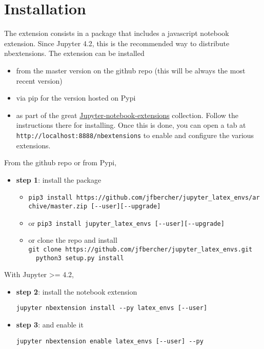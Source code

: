    \section{Installation}\label{installation}

    The extension consists in a package that includes a javascript notebook
extension. Since Jupyter 4.2, this is the recommended way to distribute
nbextensions. The extension can be installed

\begin{itemize}
\tightlist
\item
  from the master version on the github repo (this will be always the
  most recent version)
\item
  via pip for the version hosted on Pypi
\item
  as part of the great
  \href{https://github.com/ipython-contrib/Jupyter-notebook-extensions}{Jupyter-notebook-extensions}
  collection. Follow the instructions there for installing. Once this is
  done, you can open a tab at
  \texttt{http://localhost:8888/nbextensions} to enable and configure
  the various extensions.
\end{itemize}

From the github repo or from Pypi,

\begin{itemize}
\tightlist
\item
  \textbf{step 1}: install the package

  \begin{itemize}
  \tightlist
  \item
    \texttt{pip3\ install\ https://github.com/jfbercher/jupyter\_latex\_envs/archive/master.zip\ {[}-\/-user{]}{[}-\/-upgrade{]}}
  \item
    { or}
    \texttt{pip3\ install\ jupyter\_latex\_envs\ {[}-\/-user{]}{[}-\/-upgrade{]}}
  \item
    { or} clone the repo and install
    \texttt{git\ clone\ https://github.com/jfbercher/jupyter\_latex\_envs.git\ \ \ \ python3\ setup.py\ install}
  \end{itemize}
\end{itemize}

With Jupyter \textgreater{}= 4.2,

\begin{itemize}
\item
  \textbf{step 2}: install the notebook extension

\begin{verbatim}
jupyter nbextension install --py latex_envs [--user]
\end{verbatim}
\item
  \textbf{step 3}: and enable it

\begin{verbatim}
jupyter nbextension enable latex_envs [--user] --py
\end{verbatim}
\end{itemize}

